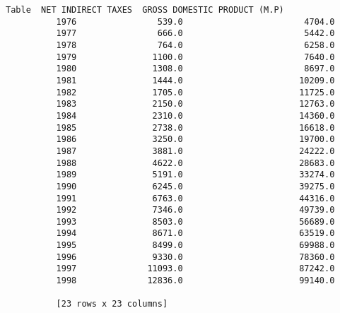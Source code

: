 \documentclass[11pt]{article}
\begin{document}
\begin{Verbatim}[commandchars=\\\{\}]
          Table  NET INDIRECT TAXES  GROSS DOMESTIC PRODUCT (M.P)  
          1976                539.0                        4704.0  
          1977                666.0                        5442.0  
          1978                764.0                        6258.0  
          1979               1100.0                        7640.0  
          1980               1308.0                        8697.0  
          1981               1444.0                       10209.0  
          1982               1705.0                       11725.0  
          1983               2150.0                       12763.0  
          1984               2310.0                       14360.0  
          1985               2738.0                       16618.0  
          1986               3250.0                       19700.0  
          1987               3881.0                       24222.0  
          1988               4622.0                       28683.0  
          1989               5191.0                       33274.0  
          1990               6245.0                       39275.0  
          1991               6763.0                       44316.0  
          1992               7346.0                       49739.0  
          1993               8503.0                       56689.0  
          1994               8671.0                       63519.0  
          1995               8499.0                       69988.0  
          1996               9330.0                       78360.0  
          1997              11093.0                       87242.0  
          1998              12836.0                       99140.0  
          
          [23 rows x 23 columns]
\end{Verbatim}
            
\end{document}
